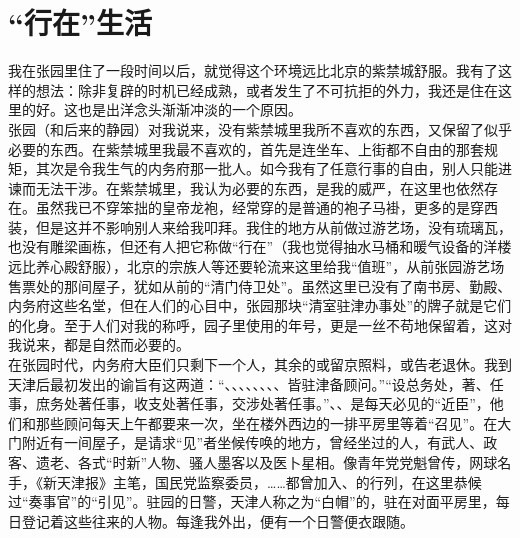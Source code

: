 \fancyhead[RO]{} %
\fancyhead[LE]{} %
\chapter*{“行在”生活}
\thispagestyle{empty}
我在张园里住了一段时间以后，就觉得这个环境远比北京的紫禁城舒服。我有了这样的想法：除非复辟的时机已经成熟，或者发生了不可抗拒的外力，我还是住在这里的好。这也是出洋念头渐渐冲淡的一个原因。\\

张园（和后来的静园）对我说来，没有紫禁城里我所不喜欢的东西，又保留了似乎必要的东西。在紫禁城里我最不喜欢的，首先是连坐车、上街都不自由的那套规矩，其次是令我生气的内务府那一批人。如今我有了任意行事的自由，别人只能进谏而无法干涉。在紫禁城里，我认为必要的东西，是我的威严，在这里也依然存在。虽然我已不穿笨拙的皇帝龙袍，经常穿的是普通的袍子马褂，更多的是穿西装，但是这并不影响别人来给我叩拜。我住的地方从前做过游艺场，没有琉璃瓦，也没有雕梁画栋，但还有人把它称做“行在”（我也觉得抽水马桶和暖气设备的洋楼远比养心殿舒服），北京的宗族人等还要轮流来这里给我“值班”，从前张园游艺场售票处的那间屋子，犹如从前的“清门侍卫处”。虽然这里已没有了南书房、勤殿、内务府这些名堂，但在人们的心目中，张园那块“清室驻津办事处”的牌子就是它们的化身。至于人们对我的称呼，园子里使用的年号，更是一丝不苟地保留着，这对我说来，都是自然而必要的。\\

在张园时代，内务府大臣们只剩下一个人，其余的或留京照料，或告老退休。我到天津后最初发出的谕旨有这两道：“、、、、、、、、皆驻津备顾问。”“设总务处，著、任事，庶务处著任事，收支处著任事，交涉处著任事。”、、是每天必见的“近臣”，他们和那些顾问每天上午都要来一次，坐在楼外西边的一排平房里等着“召见”。在大门附近有一间屋子，是请求“见”者坐候传唤的地方，曾经坐过的人，有武人、政客、遗老、各式“时新”人物、骚人墨客以及医卜星相。像青年党党魁曾传，网球名手，《新天津报》主笔，国民党监察委员，……都曾加入、的行列，在这里恭候过“奏事官”的“引见”。驻园的日警，天津人称之为“白帽”的，驻在对面平房里，每日登记着这些往来的人物。每逢我外出，便有一个日警便衣跟随。\\

